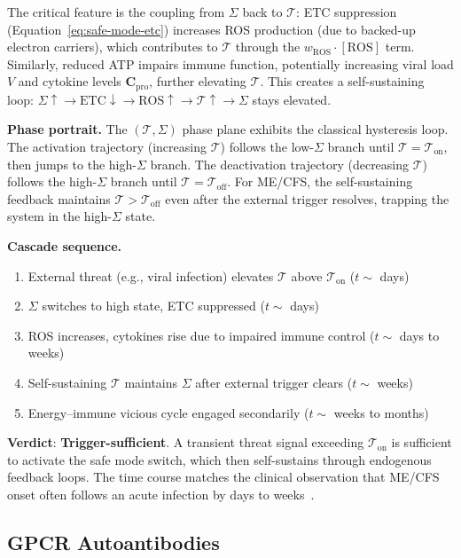 The critical feature is the coupling from $\Sigma$ back to $\mathcal{T}$: ETC suppression (Equation~\ref{eq:safe-mode-etc}) increases ROS production (due to backed-up electron carriers), which contributes to $\mathcal{T}$ through the $w_{\text{ROS}} \cdot [\text{ROS}]$ term. Similarly, reduced ATP impairs immune function, potentially increasing viral load $V$ and cytokine levels $\boldsymbol{C}_{\text{pro}}$, further elevating $\mathcal{T}$. This creates a self-sustaining loop: $\Sigma \uparrow \to \text{ETC} \downarrow \to \text{ROS} \uparrow \to \mathcal{T} \uparrow \to \Sigma$ stays elevated.

\textbf{Phase portrait.} The $(\mathcal{T}, \Sigma)$ phase plane exhibits the classical hysteresis loop. The activation trajectory (increasing $\mathcal{T}$) follows the low-$\Sigma$ branch until $\mathcal{T} = \mathcal{T}_{\text{on}}$, then jumps to the high-$\Sigma$ branch. The deactivation trajectory (decreasing $\mathcal{T}$) follows the high-$\Sigma$ branch until $\mathcal{T} = \mathcal{T}_{\text{off}}$. For ME/CFS, the self-sustaining feedback maintains $\mathcal{T} > \mathcal{T}_{\text{off}}$ even after the external trigger resolves, trapping the system in the high-$\Sigma$ state.

\textbf{Cascade sequence.}
\begin{enumerate}
    \item External threat (e.g., viral infection) elevates $\mathcal{T}$ above $\mathcal{T}_{\text{on}}$ ($t \sim$ days)
    \item $\Sigma$ switches to high state, ETC suppressed ($t \sim$ days)
    \item ROS increases, cytokines rise due to impaired immune control ($t \sim$ days to weeks)
    \item Self-sustaining $\mathcal{T}$ maintains $\Sigma$ after external trigger clears ($t \sim$ weeks)
    \item Energy--immune vicious cycle engaged secondarily ($t \sim$ weeks to months)
\end{enumerate}

\textbf{Verdict}: \textbf{Trigger-sufficient}. A transient threat signal exceeding $\mathcal{T}_{\text{on}}$ is sufficient to activate the safe mode switch, which then self-sustains through endogenous feedback loops. The time course matches the clinical observation that ME/CFS onset often follows an acute infection by days to weeks~\cite{Hickie2006postinfectious}.

\subsection{GPCR Autoantibodies}
\label{sec:trigger-aab}


